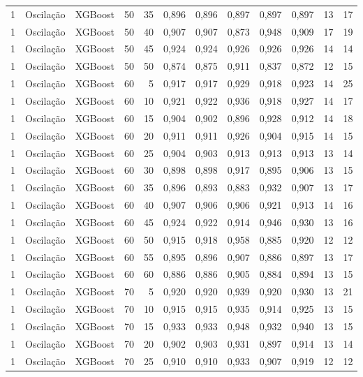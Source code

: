 \begin{longtable}{@{}rllrrrrrrrrr@{}}
1 & Oscilação & XGBoost & 50 & 35 & 0,896 & 0,896 & 0,897 & 0,897 & 0,897 & 13 & 17 \\
1 & Oscilação & XGBoost & 50 & 40 & 0,907 & 0,907 & 0,873 & 0,948 & 0,909 & 17 & 19 \\
1 & Oscilação & XGBoost & 50 & 45 & 0,924 & 0,924 & 0,926 & 0,926 & 0,926 & 14 & 14 \\
1 & Oscilação & XGBoost & 50 & 50 & 0,874 & 0,875 & 0,911 & 0,837 & 0,872 & 12 & 15 \\
1 & Oscilação & XGBoost & 60 & 5 & 0,917 & 0,917 & 0,929 & 0,918 & 0,923 & 14 & 25 \\
1 & Oscilação & XGBoost & 60 & 10 & 0,921 & 0,922 & 0,936 & 0,918 & 0,927 & 14 & 17 \\
1 & Oscilação & XGBoost & 60 & 15 & 0,904 & 0,902 & 0,896 & 0,928 & 0,912 & 14 & 18 \\
1 & Oscilação & XGBoost & 60 & 20 & 0,911 & 0,911 & 0,926 & 0,904 & 0,915 & 14 & 15 \\
1 & Oscilação & XGBoost & 60 & 25 & 0,904 & 0,903 & 0,913 & 0,913 & 0,913 & 13 & 14 \\
1 & Oscilação & XGBoost & 60 & 30 & 0,898 & 0,898 & 0,917 & 0,895 & 0,906 & 13 & 15 \\
1 & Oscilação & XGBoost & 60 & 35 & 0,896 & 0,893 & 0,883 & 0,932 & 0,907 & 13 & 17 \\
1 & Oscilação & XGBoost & 60 & 40 & 0,907 & 0,906 & 0,906 & 0,921 & 0,913 & 14 & 16 \\
1 & Oscilação & XGBoost & 60 & 45 & 0,924 & 0,922 & 0,914 & 0,946 & 0,930 & 13 & 16 \\
1 & Oscilação & XGBoost & 60 & 50 & 0,915 & 0,918 & 0,958 & 0,885 & 0,920 & 12 & 12 \\
1 & Oscilação & XGBoost & 60 & 55 & 0,895 & 0,896 & 0,907 & 0,886 & 0,897 & 13 & 17 \\
1 & Oscilação & XGBoost & 60 & 60 & 0,886 & 0,886 & 0,905 & 0,884 & 0,894 & 13 & 15 \\
1 & Oscilação & XGBoost & 70 & 5 & 0,920 & 0,920 & 0,939 & 0,920 & 0,930 & 13 & 21 \\
1 & Oscilação & XGBoost & 70 & 10 & 0,915 & 0,915 & 0,935 & 0,914 & 0,925 & 13 & 15 \\
1 & Oscilação & XGBoost & 70 & 15 & 0,933 & 0,933 & 0,948 & 0,932 & 0,940 & 13 & 15 \\
1 & Oscilação & XGBoost & 70 & 20 & 0,902 & 0,903 & 0,931 & 0,897 & 0,914 & 13 & 14 \\
1 & Oscilação & XGBoost & 70 & 25 & 0,910 & 0,910 & 0,933 & 0,907 & 0,919 & 12 & 12 \\

\end{longtable}
